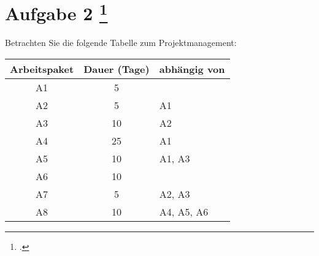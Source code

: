 \documentclass{lehramt-informatik-aufgabe}
\begin{document}
\section{Aufgabe 2
\footcite{examen:66116:2020:09}}

Betrachten Sie die folgende Tabelle zum Projektmanagement:

\begin{center}
\begin{tabular}{|c|c|l|}
\hline
\textbf{Arbeitspaket} & \textbf{Dauer (Tage)} & \textbf{abhängig von}\\\hline
A1 & 5  & \\\hline
A2 & 5  & A1 \\\hline
A3 & 10 & A2 \\\hline
A4 & 25 & A1 \\\hline
A5 & 10 & A1, A3\\\hline
A6 & 10 & \\\hline
A7 & 5  & A2, A3 \\\hline
A8 & 10 & A4, A5, A6 \\\hline
\end{tabular}
\end{center}
\end{document}
